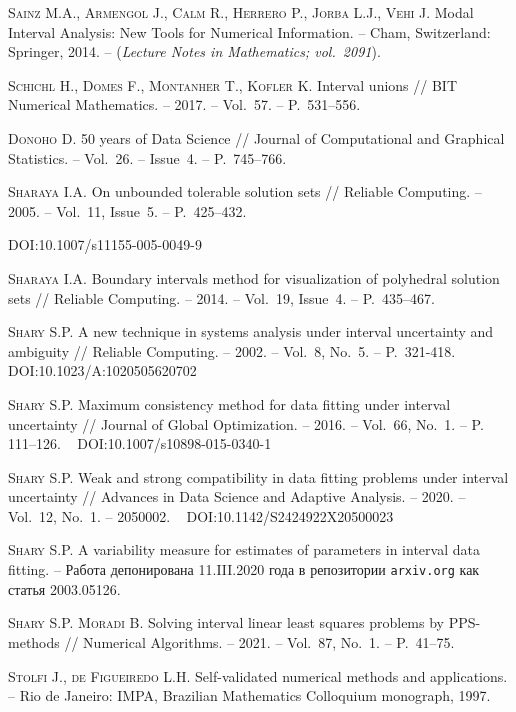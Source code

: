 \documentclass[a5paper,openany]{book}
\newcommand{\electronicbook}{}%
\newcommand{\doi}[1]{
    \ifdefined\electronicbook
        DOI:#1
    \fi}%
\begin{document}
\begin{thebibliography}{999}
\textsc{Sainz M.A., Armengol J., Calm R., Herrero P., Jorba L.J., Vehi J.}
Modal Interval Analysis: New Tools for Numerical Information. -- Cham, Switzerland: 
Springer, 2014. -- (\textsl{Lecture Notes in Mathematics; vol.~2091}). 

\textsc{Schichl H., Domes F., Montanher T., Kofler K.} Interval unions // 
BIT Numerical Mathematics. -- 2017. -- Vol.~57. -- P.~531–556. 

\textsc{Donoho D.} 50 years of Data Science // Journal of Computational and Graphical 
Statistics. -- Vol.~26. -- Issue~4. -- P.~745--766. 
  
\textsc{Sharaya I.A.} On unbounded tolerable solution sets // Reliable Computing.  
-- 2005. -- Vol.~11, Issue~5. -- P.~425--432. 
\doi{10.1007/s11155-005-0049-9} 
    
\textsc{Sharaya I.A.} Boundary intervals method for visualization of polyhedral 
solution sets // Reliable Computing. -- 2014. -- Vol.~19, Issue~4. -- P.~435--467. 
    
\textsc{Shary S.P.} A new technique in systems analysis under interval uncertainty 
and ambiguity // Reliable Computing. -- 2002. -- Vol.~8, No.~5. -- P.~321-418. \ 
\doi{10.1023/A:1020505620702} 
  
\textsc{Shary S.P.} Maximum consistency method for data fitting under interval 
uncertainty // Journal of Global Optimization. -- 2016. -- Vol.~66, No.~1. 
-- P. 111--126. \ 
\doi{10.1007/s10898-015-0340-1} 
  
\textsc{Shary S.P.} Weak and strong compatibility in data fitting problems 
under interval uncertainty // Advances in Data Science and Adaptive Analysis. -- 
2020. -- Vol.~12, No.~1. -- 2050002. \ 
\doi{10.1142/S2424922X20500023} 
  
\bibitem{SShary-arXiv}   
\textsc{Shary S.P.} A variability measure for estimates of parameters in interval 
data fitting. -- Работа депонирована 11.III.2020 года в репозитории \texttt{arxiv.org}  
как статья 2003.05126. 
  
\bibitem{SharyMoradi} 
\textsc{Shary S.P. Moradi B.} Solving interval linear least squares problems 
by PPS-methods //  Numerical Algorithms. -- 2021. -- Vol.~87, No.~1. -- P.~41--75.  
  
\bibitem{StolfiFigueiredo} 
\textsc{Stolfi J., de Figueiredo L.H.} Self-validated numerical methods and applications. 
-- Rio de Janeiro: IMPA, Brazilian Mathematics Colloquium monograph, 1997. 
  

\end{thebibliography}
\end{document}

